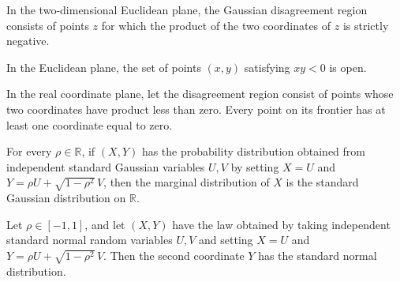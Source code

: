 \begin{definition}
\label{FABL.gaussianDisagreementRegion}
\leanok
{}
In the two-dimensional Euclidean plane, the Gaussian disagreement region consists of
points $z$ for which the product of the two coordinates of $z$ is strictly negative.
\end{definition}

\begin{theorem}
\label{FABL.isOpen_gaussianDisagreementRegion}
\leanok
{}
In the Euclidean plane, the set of points $(x,y)$ satisfying $xy<0$ is open.
\end{theorem}

\begin{theorem}
\label{FABL.frontier_gaussianDisagreementRegion_subset}
\leanok
{}
In the real coordinate plane, let the disagreement region consist of points whose two
coordinates have product less than zero. Every point on its frontier has at least one
coordinate equal to zero.
\end{theorem}

\begin{theorem}
\label{FABL.correlatedGaussianMeasure_map_firstCoordinate}
\leanok
{}
For every $\rho\in\mathbb R$, if $(X,Y)$ has the probability distribution obtained from
independent standard Gaussian variables $U,V$ by setting $X=U$ and $Y=\rho
U+\sqrt{1-\rho^2}\,V$, then the marginal distribution of $X$ is the standard Gaussian
distribution on $\mathbb R$.
\end{theorem}

\begin{theorem}
\label{FABL.correlatedGaussianMeasure_map_secondCoordinate}
\leanok
{}
Let $\rho\in[-1,1]$, and let $(X,Y)$ have the law obtained by taking independent
standard normal random variables $U,V$ and setting $X=U$ and $Y=\rho
U+\sqrt{1-\rho^2}\,V$. Then the second coordinate $Y$ has the standard normal
distribution.
\end{theorem}

